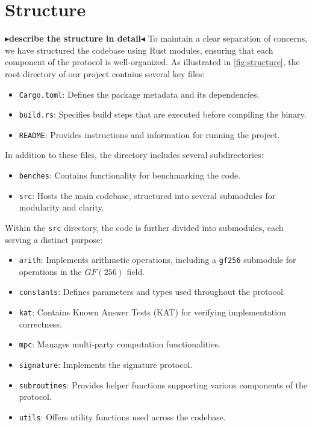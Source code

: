 \documentclass[twoside,11pt]{report}
\theoremstyle{definition}
\theoremstyle{plain}
\newcommand{\todo}[1]{{\color[rgb]{.5,0,0}\textbf{$\blacktriangleright$#1$\blacktriangleleft$}}}
\begin{document}
\section{Structure}
\todo{describe the structure in detail}
To maintain a clear separation of concerns, we have structured the codebase using Rust modules, ensuring that each component of the protocol is well-organized. As illustrated in \autoref{fig:structure}, the root directory of our project contains several key files:

\begin{itemize}
  \item \texttt{Cargo.toml}: Defines the package metadata and its dependencies.
  \item \texttt{build.rs}: Specifies build steps that are executed before compiling the binary.
  \item \texttt{README}: Provides instructions and information for running the project.
\end{itemize}

In addition to these files, the directory includes several subdirectories:

\begin{itemize}
  \item \texttt{benches}: Contains functionality for benchmarking the code.
  \item \texttt{src}: Hosts the main codebase, structured into several submodules for modularity and clarity.
\end{itemize}

Within the \texttt{src} directory, the code is further divided into submodules, each serving a distinct purpose:

\begin{itemize}
  \item \texttt{arith}: Implements arithmetic operations, including a \texttt{gf256} submodule for operations in the $GF(256)$ field.
  \item \texttt{constants}: Defines parameters and types used throughout the protocol.
  \item \texttt{kat}: Contains Known Answer Tests (KAT) for verifying implementation correctness.
  \item \texttt{mpc}: Manages multi-party computation functionalities.
  \item \texttt{signature}: Implements the signature protocol.
  \item \texttt{subroutines}: Provides helper functions supporting various components of the protocol.
  \item \texttt{utils}: Offers utility functions used across the codebase.
\end{itemize}
\end{document}

